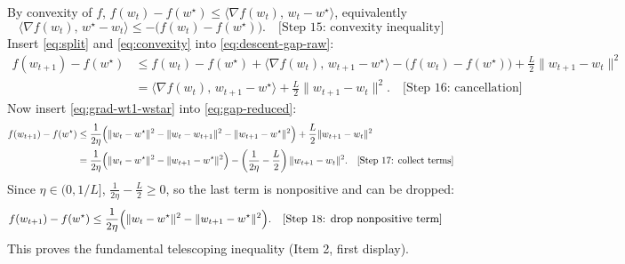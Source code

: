 \documentclass[11pt]{article}
\begin{document}
By convexity of $f$, $f(w_t)-f(w^\star)\le \langle \nabla f(w_t),\, w_t - w^\star\rangle$, equivalently
\begin{equation}
\langle \nabla f(w_t),\, w^\star-w_t\rangle \le -\bigl(f(w_t)-f(w^\star)\bigr). \quad \text{[Step 15: convexity inequality]}
\label{eq:convexity}
\end{equation}
Insert \eqref{eq:split} and \eqref{eq:convexity} into \eqref{eq:descent-gap-raw}:
\begin{align}
f(w_{t+1}) - f(w^\star)
&\le f(w_t) - f(w^\star) + \langle \nabla f(w_t),\, w_{t+1}-w^\star\rangle - \bigl(f(w_t)-f(w^\star)\bigr) + \frac{L}{2}\|w_{t+1}-w_t\|^2 \nonumber\\
&= \langle \nabla f(w_t),\, w_{t+1}-w^\star\rangle + \frac{L}{2}\|w_{t+1}-w_t\|^2. \quad \text{[Step 16: cancellation]}
\label{eq:gap-reduced}
\end{align}
Now insert \eqref{eq:grad-wt1-wstar} into \eqref{eq:gap-reduced}:
\begin{align}
f(w_{t+1}) - f(w^\star)
&\le \frac{1}{2\eta}\Bigl(\|w_t - w^\star\|^2 - \|w_t - w_{t+1}\|^2 - \|w_{t+1} - w^\star\|^2\Bigr) + \frac{L}{2}\|w_{t+1}-w_t\|^2 \nonumber\\
&= \frac{1}{2\eta}\Bigl(\|w_t - w^\star\|^2 - \|w_{t+1} - w^\star\|^2\Bigr) - \left(\frac{1}{2\eta}-\frac{L}{2}\right)\|w_{t+1}-w_t\|^2. \quad \text{[Step 17: collect terms]}
\label{eq:telescoping-core}
\end{align}
Since $\eta\in(0,1/L]$, $\frac{1}{2\eta}-\frac{L}{2}\ge 0$, so the last term is nonpositive and can be dropped:
\begin{align}
f(w_{t+1}) - f(w^\star)
&\le \frac{1}{2\eta}\Bigl(\|w_t - w^\star\|^2 - \|w_{t+1} - w^\star\|^2\Bigr). \quad \text{[Step 18: drop nonpositive term]}
\label{eq:telescoping-ineq}
\end{align}
This proves the fundamental telescoping inequality (Item 2, first display).
\end{document}
